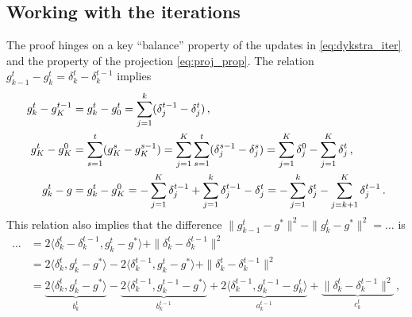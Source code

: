 \documentclass[a4paper]{article}
\begin{document}


\subsection*{Working with the iterations} %
\label{sub:working_with_the_iterations}

The proof hinges on a key ``balance'' property of the updates in \eqref{eq:dykstra_iter}
and the property of the projection \eqref{eq:proj_prop}. The relation $g^t_{k-1} - g^t_k =
\delta^t_k - \delta^{t-1}_k$ implies
\begin{align}
  g^t_k - g^{t-1}_K
    &= g^t_k - g^t_0
      = \sum_{j=1}^k (\delta^{t-1}_j - \delta^t_j)
    \,, \notag \\
  g^t_K - g^0_K
    &= \sum_{s=1}^t (g^s_K - g^{s-1}_K)
    = \sum_{j=1}^K \sum_{s=1}^t (\delta^{s-1}_j - \delta^s_j)
    = \sum_{j=1}^K \delta^0_j - \sum_{j=1}^K \delta^t_j
    \,, \label{eq:tK_iterate} \\
  g^t_k - g
    &= g^t_k - g^0_K
    = - \sum_{j=1}^K \delta^{t-1}_j + \sum_{j=1}^k \delta^{t-1}_j - \delta^t_j
    = - \sum_{j=1}^k \delta^t_j - \sum_{j=k+1}^K \delta^{t-1}_j
    \,. \notag
\end{align}
This relation also implies that the difference $\|g^t_{k-1} - g^*\|^2 - \|g^t_k - g^*\|^2
= \ldots$ is
\begin{align*}
  \ldots
    &= 2 \langle \delta^t_k - \delta^{t-1}_k, g^t_k - g^* \rangle
      + \| \delta^t_k - \delta^{t-1}_k \|^2
    \\
    &= 2 \langle \delta^t_k, g^t_k - g^* \rangle
      - 2 \langle \delta^{t-1}_k, g^t_k - g^* \rangle
      + \| \delta^t_k - \delta^{t-1}_k \|^2
    \\
    &= \underbrace{2 \langle \delta^t_k, g^t_k - g^* \rangle}_{b^t_k}
      - \underbrace{2 \langle \delta^{t-1}_k, g^{t-1}_k - g^* \rangle}_{b^{t-1}_k}
      + \underbrace{2 \langle \delta^{t-1}_k, g^{t-1}_k - g^t_k\rangle}_{a^{t-1}_k}
      + \underbrace{\| \delta^t_k - \delta^{t-1}_k \|^2}_{c^t_k}
    \,,
\end{align*}
\end{document}
